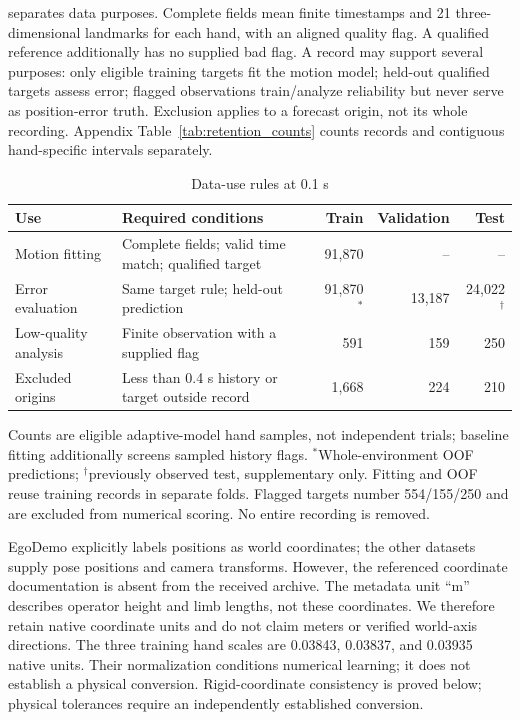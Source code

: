  separates data purposes. Complete fields mean finite timestamps and 21 three-dimensional landmarks for each hand, with an aligned quality flag. A qualified reference additionally has no supplied bad flag. A record may support several purposes: only eligible training targets fit the motion model; held-out qualified targets assess error; flagged observations train/analyze reliability but never serve as position-error truth. Exclusion applies to a forecast origin, not its whole recording. Appendix Table~\ref{tab:retention_counts} counts records and contiguous hand-specific intervals separately.
\begin{table}[!htbp]
\centering\small
\caption{Data-use rules at 0.1 s}
\label{tab:uses}
\begin{tabularx}{\linewidth}{lXrrr}
\toprule
Use & Required conditions & Train & Validation & Test\\
\midrule
Motion fitting & Complete fields; valid time match; qualified target & 91,870 & -- & --\\
Error evaluation & Same target rule; held-out prediction & 91,870$^*$ & 13,187 & 24,022$^\dagger$\\
Low-quality analysis & Finite observation with a supplied flag & 591 & 159 & 250\\
Excluded origins & Less than 0.4 s history or target outside record & 1,668 & 224 & 210\\
\bottomrule
\end{tabularx}
\par\vspace{4pt}
\parbox{\linewidth}{\footnotesize Counts are eligible adaptive-model hand samples, not independent trials; baseline fitting additionally screens sampled history flags. $^*$Whole-environment OOF predictions; $^\dagger$previously observed test, supplementary only. Fitting and OOF reuse training records in separate folds. Flagged targets number 554/155/250 and are excluded from numerical scoring. No entire recording is removed.}
\end{table}

EgoDemo explicitly labels positions as world coordinates; the other datasets supply pose positions and camera transforms. However, the referenced coordinate documentation is absent from the received archive. The metadata unit ``m'' describes operator height and limb lengths, not these coordinates. We therefore retain native coordinate units and do not claim meters or verified world-axis directions. The three training hand scales are 0.03843, 0.03837, and 0.03935 native units. Their normalization conditions numerical learning; it does not establish a physical conversion. Rigid-coordinate consistency is proved below; physical tolerances require an independently established conversion.

